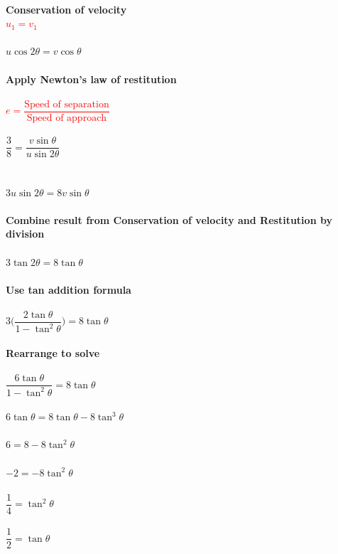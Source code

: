 \documentclass{article}[18pt]
\begin{document}
\\
\textbf{Conservation of velocity}\\
\textcolor{red}{$u_1=v_1$}\\
\\
$u\cos2\theta=v\cos\theta$\\
\\
\textbf{Apply Newton's law of restitution}\\
\\
\textcolor{red}{$e=\dfrac{\text{Speed of separation}}{\text{Speed of approach}}$}\\
\\
$\dfrac{3}{8}=\dfrac{v\sin\theta}{u\sin2\theta}$\\
\\
\\
$3u\sin2\theta=8v\sin\theta$\\
\\
\textbf{Combine result from Conservation of velocity and Restitution by division}\\
\\
$3\tan2\theta=8\tan\theta$\\
\\
\textbf{Use tan addition formula}\\
\\
$3\Bigg(\dfrac{2\tan\theta}{1-\tan^2\theta}\Bigg)=8\tan\theta$\\
\\
\textbf{Rearrange to solve}\\
\\
$\dfrac{6\tan\theta}{1-\tan^2\theta}=8\tan\theta$\\
\\
$6\tan\theta=8\tan\theta-8\tan^3\theta$\\
\\
$6=8-8\tan^2\theta$\\
\\
$-2=-8\tan^2\theta$\\
\\
$\dfrac{1}{4}=\tan^2\theta$\\
\\
$\dfrac{1}{2}=\tan\theta$
\end{document}
